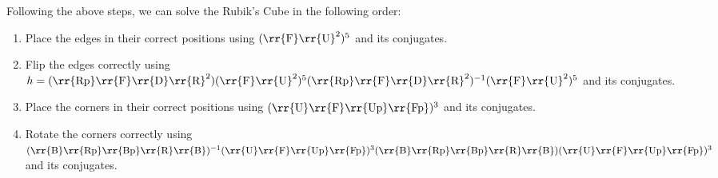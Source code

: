 Following the above steps, we can solve the Rubik's Cube in the following order:
\begin{enumerate}
    \item Place the edges in their correct positions using $(\text{\rr{F}\rr{U}}^{2})^{5}$ and its conjugates.
    \item Flip the edges correctly using $h = (\text{\rr{Rp}\rr{F}\rr{D}\rr{R}}^{2}) (\text{\rr{F}\rr{U}}^{2})^{5} (\text{\rr{Rp}\rr{F}\rr{D}\rr{R}}^{2})^{-1}(\text{\rr{F}\rr{U}}^{2})^{5}$ and its conjugates.
    \item Place the corners in their correct positions using $(\text{\rr{U}\rr{F}\rr{Up}\rr{Fp}})^{3}$ and its conjugates.
    \item Rotate the corners correctly using $(\text{\rr{B}\rr{Rp}\rr{Bp}\rr{R}\rr{B}})^{-1} (\text{\rr{U}\rr{F}\rr{Up}\rr{Fp}})^{3} (\text{\rr{B}\rr{Rp}\rr{Bp}\rr{R}\rr{B}}) (\text{\rr{U}\rr{F}\rr{Up}\rr{Fp}})^{3}$ and its conjugates.
\end{enumerate}